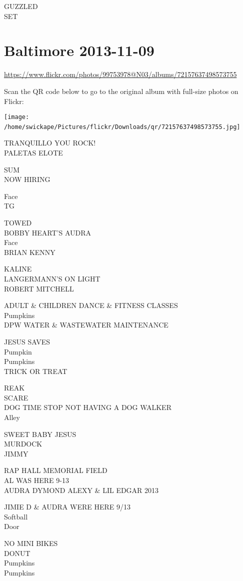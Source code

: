 \documentclass[10pt,letterpaper]{article}
\begin{document}
GUZZLED\\
SET
\

\section*{Baltimore 2013-11-09}

\url{https://www.flickr.com/photos/99753978@N03/albums/72157637498573755}

Scan the QR code below to go to the original album with full-size photos on Flickr:

\texttt{[image: /home/swickape/Pictures/flickr/Downloads/qr/72157637498573755.jpg]}
\

TRANQUILLO YOU ROCK!\\
PALETAS ELOTE

SUM\\
NOW HIRING

Face\\
TG

TOWED\\
BOBBY HEART'S AUDRA\\
Face\\
BRIAN KENNY

KALINE\\
LANGERMANN'S ON LIGHT\\
ROBERT MITCHELL

ADULT \& CHILDREN DANCE \& FITNESS CLASSES\\
Pumpkins\\
DPW WATER \& WASTEWATER MAINTENANCE

JESUS SAVES\\
Pumpkin\\
Pumpkins\\
TRICK OR TREAT

REAK\\
SCARE\\
DOG TIME STOP NOT HAVING A DOG WALKER\\
Alley

SWEET BABY JESUS\\
MURDOCK\\
JIMMY

RAP HALL MEMORIAL FIELD\\
AL WAS HERE 9{-}13\\
AUDRA DYMOND ALEXY \& LIL EDGAR 2013

JIMIE D \& AUDRA WERE HERE 9/13\\
Softball\\
Door

NO MINI BIKES\\
DONUT\\
Pumpkins\\
Pumpkins
\end{document}
